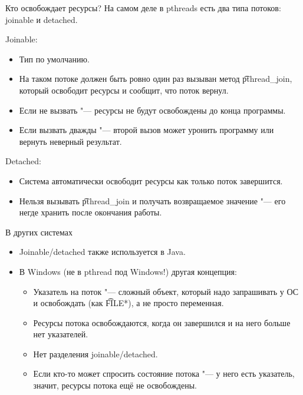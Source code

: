 \begin{frame}{Кто освобождает ресурсы?}
	На самом деле в pthreads есть два типа потоков: joinable и detached.

	Joinable:
	\begin{itemize}
		\item Тип по умолчанию.
		\item На таком потоке должен быть ровно один раз вызыван метод \t{pthread\_join}, который освободит ресурсы и сообщит, что поток вернул.
		\item Если не вызвать "--- ресурсы не будут освобождены до конца программы.
		\item Если вызвать дважды "--- второй вызов может уронить программу или вернуть неверный результат.
	\end{itemize}

	Detached:
	\begin{itemize}
		\item Система автоматически освободит ресурсы как только поток завершится.
		\item Нельзя вызывать \t{pthread\_join} и получать возвращаемое значение "--- его негде хранить после окончания работы.
	\end{itemize}
\end{frame}

\begin{frame}{В других системах}
	\begin{itemize}
		\item Joinable/detached также используется в Java.
		\item В Windows (не в pthread под Windows!) другая концепция:
			\begin{itemize}
				\item Указатель на поток "--- сложный объект, который надо запрашивать у ОС и освобождать (как \t{FILE*}), а не просто переменная.
				\item Ресурсы потока освобождаются, когда он завершился и на него больше нет указателей.
				\item Нет разделения joinable/detached.
				\item Если кто-то может спросить состояние потока "--- у него есть указатель, значит, ресурсы потока ещё не освобождены.
			\end{itemize}
	\end{itemize}
\end{frame}


